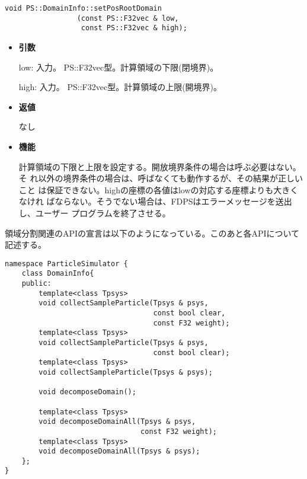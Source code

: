 \begin{screen}
\begin{verbatim}
void PS::DomainInfo::setPosRootDomain
                 (const PS::F32vec & low,
                  const PS::F32vec & high);
\end{verbatim}
\end{screen}

\begin{itemize}

\item {\bf 引数}

low: 入力。 PS::F32vec型。計算領域の下限(閉境界)。

high: 入力。 PS::F32vec型。計算領域の上限(開境界)。

\item {\bf 返値}

なし

\item {\bf 機能}

計算領域の下限と上限を設定する。開放境界条件の場合は呼ぶ必要はない。そ
れ以外の境界条件の場合は、呼ばなくても動作するが、その結果が正しいこと
は保証できない。highの座標の各値はlowの対応する座標よりも大きくなけれ
ばならない。そうでない場合は、FDPSはエラーメッセージを送出し、ユーザー
プログラムを終了させる。

\end{itemize}


領域分割関連のAPIの宣言は以下のようになっている。このあと各APIについて
記述する。
\begin{lstlisting}[caption=DomainInfo2]
namespace ParticleSimulator {
    class DomainInfo{
    public:
        template<class Tpsys>
        void collectSampleParticle(Tpsys & psys,
                                   const bool clear,
                                   const F32 weight);
        template<class Tpsys>
        void collectSampleParticle(Tpsys & psys,
                                   const bool clear);
        template<class Tpsys>
        void collectSampleParticle(Tpsys & psys);
        
        void decomposeDomain();
        
        template<class Tpsys>
        void decomposeDomainAll(Tpsys & psys,
                                const F32 weight);
        template<class Tpsys>
        void decomposeDomainAll(Tpsys & psys);
    };
}
\end{lstlisting}

